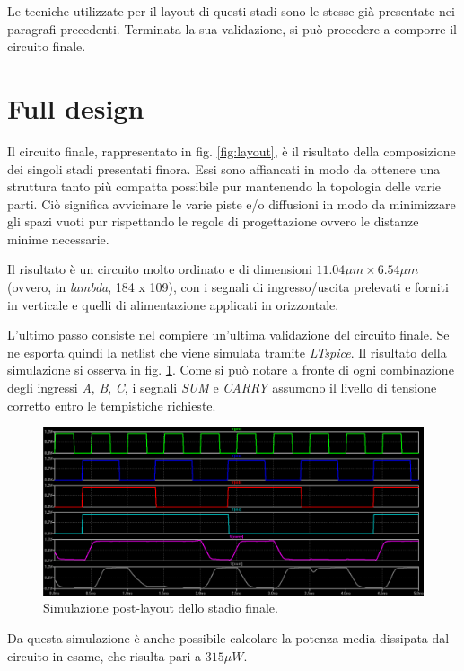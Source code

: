 Le tecniche utilizzate per il layout di questi stadi sono le stesse già presentate nei paragrafi precedenti. Terminata la sua validazione, si può procedere a comporre il circuito finale.

\section{Full design}
\label{sec:sec_fullDesign}

Il circuito finale, rappresentato in fig. \ref{fig:layout}, è il risultato della composizione dei singoli stadi presentati finora. Essi sono affiancati in modo da ottenere una struttura tanto più compatta possibile pur mantenendo la topologia delle varie parti. Ciò significa avvicinare le varie piste e/o diffusioni in modo da minimizzare gli spazi vuoti pur rispettando le regole di progettazione ovvero le distanze minime necessarie. 

Il risultato è un circuito molto ordinato e di dimensioni $11.04 \mu m \times 6.54 \mu m$ (ovvero, in \textit{lambda}, 184 x 109), con i segnali di ingresso/uscita prelevati e forniti in verticale e quelli di alimentazione applicati in orizzontale.

L'ultimo passo consiste nel compiere un'ultima validazione del circuito finale. Se ne esporta quindi la netlist che viene simulata tramite \textit{LTspice}. Il risultato della simulazione si osserva in fig. \ref{fig:simulazioneFinale}. Come si può notare a fronte di ogni combinazione degli ingressi \textit{A}, \textit{B}, \textit{C}, i segnali \textit{SUM} e \textit{CARRY} assumono il livello di tensione corretto entro le tempistiche richieste.  

\begin{figure}[hbt!]
	\centering
	\includegraphics[width=1.5\textwidth, angle=90]{figure/Sim_FullDesign_PostLayout.PNG}
	\caption{Simulazione post-layout dello stadio finale.}
	\label{fig:simulazioneFinale}
\end{figure}

Da questa simulazione è anche possibile calcolare la potenza media dissipata dal circuito in esame, che risulta pari a $315\mu W$.






